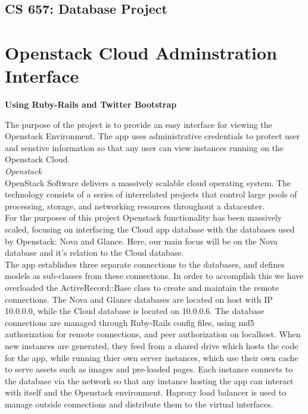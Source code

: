 \documentclass[12pt]{article}
\begin{document}
\begin{center}
\section*{CS 657: Database Project}
\end{center}
\noindent

\section*{Openstack Cloud Adminstration Interface}
\textbf{Using Ruby-Rails and Twitter Bootstrap}

The purpose of the project is to provide an easy interface for viewing the Openstack Environment. The app uses administrative credentials to protect user and senstive information so that any user can view instances running on the Openstack Cloud.\\

\emph{Openstack}\\
OpenStack Software delivers a massively scalable cloud operating system. The technology consists of a series of interrelated projects that control large pools of processing, storage, and networking resources throughout a datacenter.\\

For the purposes of this project Openstack functionality has been massively scaled, focusing on interfacing the Cloud app database with the databases used by Openstack: Nova and Glance. Here, our main focus will be on the Nova database and it's relation to the Cloud database.\\

The app establishes three separate connections to the databases, and defines models as sub-classes from these connections. In order to accomplish this we have overloaded the ActiveRecord::Base class to create and maintain the remote connections. The Nova and Glance databases are located on host with IP 10.0.0.0, while the Cloud database is located on 10.0.0.6. The database connections are managed through Ruby-Rails config files, using md5 authorization for remote connections, and peer authorization on localhost. When new instances are generated, they feed from a shared drive which hosts the code for the app, while running thier own server instances, which use their own cache to serve assets such as images and pre-loaded pages. Each instance connects to the database via the network so that any instance hosting the app can interact with itself and the Openstack environment. Haproxy load balancer is used to manage outside connections and distribute them to the virtual interfaces.
\end{document}
